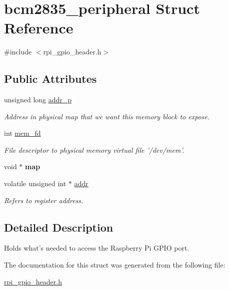\hypertarget{structbcm2835__peripheral}{\section{bcm2835\-\_\-peripheral Struct Reference}
\label{structbcm2835__peripheral}
}


{\ttfamily \#include $<$rpi\-\_\-gpio\-\_\-header.\-h$>$}

\subsection*{Public Attributes}
\begin{DoxyCompactItemize}
\item 
\hypertarget{structbcm2835__peripheral_a972e542acd3ccb0b9a5f73aa75251b57}{unsigned long \hyperlink{structbcm2835__peripheral_a972e542acd3ccb0b9a5f73aa75251b57}{addr\-\_\-p}}\label{structbcm2835__peripheral_a972e542acd3ccb0b9a5f73aa75251b57}

\begin{DoxyCompactList}\small\item\em Address in physical map that we want this memory block to expose. \end{DoxyCompactList}\item 
\hypertarget{structbcm2835__peripheral_a141406ce70084a329a865ac2e73db2f3}{int \hyperlink{structbcm2835__peripheral_a141406ce70084a329a865ac2e73db2f3}{mem\-\_\-fd}}\label{structbcm2835__peripheral_a141406ce70084a329a865ac2e73db2f3}

\begin{DoxyCompactList}\small\item\em File descriptor to physical memory virtual file '/dev/mem'. \end{DoxyCompactList}\item 
\hypertarget{structbcm2835__peripheral_a8ce91c13928c404b67e1990bf4a5018b}{void $\ast$ {\bfseries map}}\label{structbcm2835__peripheral_a8ce91c13928c404b67e1990bf4a5018b}

\item 
\hypertarget{structbcm2835__peripheral_ac33828b1b9863498b33058a4ca2985dc}{volatile unsigned int $\ast$ \hyperlink{structbcm2835__peripheral_ac33828b1b9863498b33058a4ca2985dc}{addr}}\label{structbcm2835__peripheral_ac33828b1b9863498b33058a4ca2985dc}

\begin{DoxyCompactList}\small\item\em Refers to register address. \end{DoxyCompactList}\end{DoxyCompactItemize}


\subsection{Detailed Description}
Holds what's needed to access the Raspberry Pi G\-P\-I\-O port. 

The documentation for this struct was generated from the following file\-:\begin{DoxyCompactItemize}
\item 
\hyperlink{rpi__gpio__header_8h}{rpi\-\_\-gpio\-\_\-header.\-h}\end{DoxyCompactItemize}
